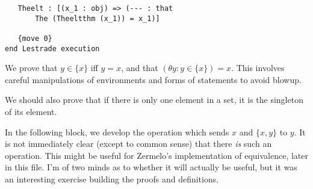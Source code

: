 \documentclass[12pt]{article}
\begin{document}
\begin{verbatim}
   Theelt : [(x_1 : obj) => (--- : that 
       The (Theeltthm (x_1)) = x_1)]

   {move 0}
end Lestrade execution
\end{verbatim}

We prove that $y \in \{x\}$ iff $y=x$, and that $(\theta y: y \in \{x\})=x$.  This involves careful manipulations of environments and forms of statements to avoid blowup.

We should also prove that if there is only one element in a set, it is the singleton of its element.

In the following block, we develop the operation which sends $x$ and $\{x,y\}$ to $y$.  It is not immediately clear (except to common sense) that there
{\em is\/} such an operation.  This might be useful for Zermelo's implementation of equivalence, later in this file.  I'm of two minds as to whether it will actually be useful, but it was an interesting exercise building the proofs and definitions.
\end{document}
